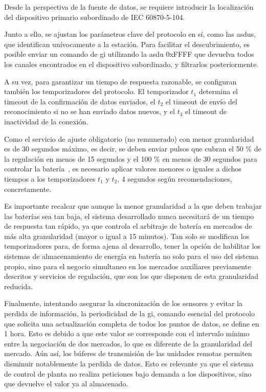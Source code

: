 Desde la perspectiva de la fuente de datos, se requiere introducir la localización del dispositivo primario subordinado de IEC 60870{-}5{-}104.

Junto a ello, se ajustan los parámetros clave del protocolo en sí, como las \glspl{asdu}, que identifican unívocamente a la estación. Para facilitar el descubrimiento, es posible enviar un comando de \gls{gi} utilizando la \gls{asdu} 0xFFFF que devuelva todos los canales encontrados en el dispositivo subordinado, y filtrarlos posteriormente.

A su vez, para garantizar un tiempo de respuesta razonable, se configuran también los temporizadores del protocolo. El temporizador \( t_1 \) determina el timeout de la confirmación de datos enviados, el \( t_2 \) el timeout de envío del reconocimiento si no se han enviado datos nuevos, y el \( t_3 \) el timeout de inactividad de la conexión.

Como el servicio de ajuste obligatorio (no remunerado) con menor granularidad es de 30 segundos máximo, es decir, se deben enviar pulsos que cubran el 50 \% de la regulación en menos de 15 segundos y el 100 \% en menos de 30 segundos para controlar la batería~\cite{cnmc2024balance}, es necesario aplicar valores menores o iguales a dichos tiempos a los temporizadores \( t_1 \) y \( t_2 \), 4 segundos según recomendaciones, concretamente.

Es importante recalcar que aunque la menor granularidad a la que deben trabajar las baterías sea tan baja, el sistema desarrollado nunca necesitará de un tiempo de respuesta tan rápido, ya que controla el arbitraje de batería en mercados de más alta granularidad (mayor o igual a 15 minutos). Tan solo se modifican los temporizadores para, de forma ajena al desarrollo, tener la opción de habilitar los sistemas de almacenamiento de energía en batería no solo para el uso del sistema propio, sino para el negocio simultaneo en los mercados auxiliares previamente descritos y servicios de regulación, que son los que disponen de esta granularidad reducida.

Finalmente, intentando asegurar la sincronización de los sensores y evitar la perdida de información, la periodicidad de la \gls{gi}, comando esencial del protocolo que solicita una actualización completa de todos los puntos de datos, se define en 1 hora. Esto es debido a que este valor se corresponde con el intervalo mínimo entre la negociación de dos mercados, lo que es diferente de la granularidad del mercado. Aún así, los búferes de transmisión de las unidades remotas permiten disminuir notablemente la perdida de datos. Esto es relevante ya que el sistema de control de planta no realiza peticiones bajo demanda a los dispositivos, sino que devuelve el valor ya al almacenado.

